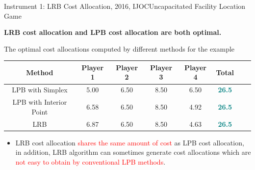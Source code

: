 \documentclass[14pt]{beamer}
\begin{document}
\begin{frame}{Instrument 1: LRB Cost Allocation, {\footnotesize 2016, IJOC}}{Uncapacitated Facility Location Game}
\small
\centering
\begin{theorem}
\justifying
\small
\centering
\textbf{\rm LRB cost allocation and LPB cost allocation are both optimal.}
\end{theorem}
\begin{shaded}
\footnotesize
\centering
The optimal cost allocations computed by different methods for the example
\end{shaded}
\vspace{-0.1em}
\scriptsize
\renewcommand\arraystretch{1.4}
\begin{tabular}[!h]{c c c c c c c c}
\hline
\multicolumn{1}{c}{Method} &\multicolumn{1}{c}{Player 1}&\multicolumn{1}{c}{Player 2} &\multicolumn{1}{c}{Player 3}  &\multicolumn{1}{c}{Player 4} &\multicolumn{1}{c}{Total}\\
\hline
LPB with Simplex	&5.00	&6.50	&8.50	&6.50	&\textcolor{teal}{\bf 26.5}	&\\
LPB with Interior Point	&6.58	&6.50	&8.50	&4.92	&\textcolor{teal}{\bf 26.5}	&\\
LRB	&6.87	&6.50	&8.50	&4.63	&\textcolor{teal}{\bf 26.5}	&\\
\hline
\end{tabular}
\vspace{0.5em}
\begin{shaded}
\vspace{-0.8em}
\begin{itemize}
\justifying
\footnotesize
\item LRB cost allocation \textcolor{red}{shares the same amount of cost} as LPB cost allocation, in addition, LRB algorithm can sometimes generate cost allocations which are \textcolor{red}{not easy to obtain by conventional LPB methods}.
\end{itemize}
\vspace{-1.2em}
\end{shaded}
\end{frame}
\end{document}
